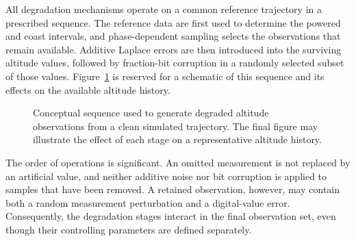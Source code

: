 All degradation mechanisms operate on a common reference trajectory in a
prescribed sequence. The reference data are first used to determine the
powered and coast intervals, and phase-dependent sampling selects the
observations that remain available. Additive Laplace errors are then
introduced into the surviving altitude values, followed by fraction-bit
corruption in a randomly selected subset of those values.
Figure~\ref{fig:noise-generation-process} is reserved for a schematic of
this sequence and its effects on the available altitude history.

\begin{figure}[htbp]
    \centering
    \caption{Conceptual sequence used to generate degraded altitude
    observations from a clean simulated trajectory. The final figure may
    illustrate the effect of each stage on a representative altitude history.}
    \label{fig:noise-generation-process}
\end{figure}

The order of operations is significant. An omitted measurement is not
replaced by an artificial value, and neither additive noise nor bit
corruption is applied to samples that have been removed. A retained
observation, however, may contain both a random measurement
perturbation and a digital-value error. Consequently, the
degradation stages interact in the final observation set, even
though their controlling parameters are defined separately.

